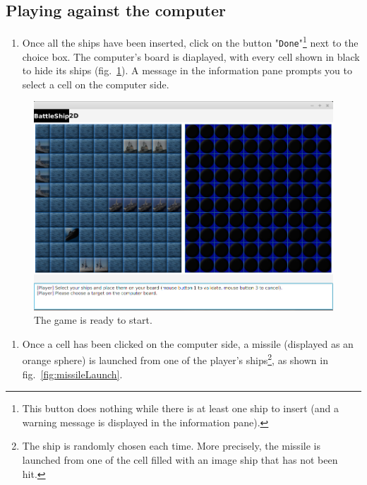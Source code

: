 \documentclass[twoside]{article}
\begin{document}
\newpage

\subsection{Playing against the computer}

\begin{enumerate}
\item[1.] Once all the ships have been inserted, click on the button "\texttt{Done}"\footnote{This button does nothing while there is at least one ship to insert (and a warning message is displayed in the information pane).} next to the choice box. The computer's board is diaplayed, with every cell shown in black to hide its ships (fig.~\ref{fig:allShipsInserted}). A message in the information pane prompts you to select a cell on the computer side.
\end{enumerate}

\begin{figure}[h!]
\centering
\includegraphics[scale=0.65]{figures/allShipsInserted.png}
\caption{The game is ready to start.}
\label{fig:allShipsInserted}
\end{figure}

\begin{enumerate}
\item[2.] Once a cell has been clicked on the computer side, a missile (displayed as an orange sphere) is launched from one of the player's ships\footnote{The ship is randomly chosen each time. More precisely, the missile is launched from one of the cell filled with an image ship that has not been hit.}, as shown in fig.~\ref{fig:missileLaunch}.
\end{enumerate}
\end{document}
